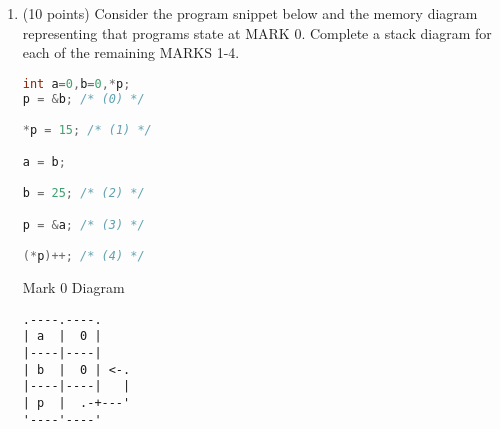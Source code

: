 \documentclass{article}[9pt]
\newenvironment{answerfont}{\fontfamily{qhv}\selectfont}{\par}
\newenvironment{myanswer}{\begin{mdframed}\begin{answerfont}}{\end{answerfont}\end{mdframed}}
\begin{document}
\begin{enumerate}
\begin{enumerate}
\begin{enumerate}
\begin{myanswer}
The output is -1. unsigned intergers are not supposed to return negative numbers because of how they are written. This means that the given value for i was too large so it returned -1 as an error.
\end{myanswer}

\item

\begin{lstlisting}[language=c]
int i = 3.1519;
printf("%d\n", i);
\end{lstlisting}


\begin{myanswer}
The output was 3 because the type of the variable is int. This means that it will not take any decimal values. The number was cut to 3.
\end{myanswer}


\item
\begin{lstlisting}[language=c]
int i = (int) 1.5 + 2.5 + 3.5 + 4.5
printf("%d\n",i);
\end{lstlisting}

\begin{myanswer}
The output is 11. This is because there is a call stating that it wants 1.5 to be evaluated as int. Therefore it is shortened to just 1. Then the operation is carried out as normal which results in 11.5. 11.5 is then assigned to int variable i which shortens 11.5 to just 11.
\end{myanswer}

\end{enumerate}

\item (10 points) Consider the program snippet below and the memory diagram representing
that programs state at MARK 0. Complete a stack diagram for each
of the remaining MARKS 1-4.

\begin{lstlisting}[language=c]
int a=0,b=0,*p;
p = &b; /* (0) */

*p = 15; /* (1) */

a = b;

b = 25; /* (2) */

p = &a; /* (3) */

(*p)++; /* (4) */
\end{lstlisting}

Mark 0 Diagram
\begin{verbatim}
.----.----.
| a  |  0 |
|----|----|
| b  |  0 | <-.
|----|----|   |
| p  |  .-+---'
'----'----'
\end{verbatim}


\end{enumerate}
\end{enumerate}
\end{document}
